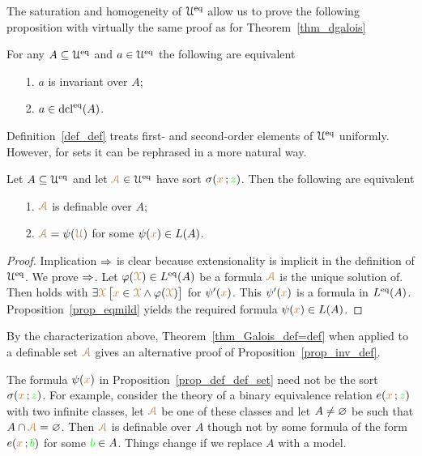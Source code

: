 \documentclass[creche.tex]{subfiles}
\begin{document}
The saturation and homogeneity of $\EuScript U^{{\rm eq}}$ allow us to prove the following proposition with virtually the same proof as for Theorem~\ref{thm_dgalois}

\begin{theorem}\label{thm_Galois_def=def}
For any $A\subseteq\EuScript U^{{\rm eq}}$ and $a\in\EuScript U^{{\rm eq}}$ the following are equivalent
\begin{itemize}
\item[1.] $a$ is invariant over $A$;
\item[2.] $a\in\mathop{\rm dcl}^{{\rm eq}}(A)$.\QED
\end{itemize}
\end{theorem}

Definition~\ref{def_def} treats first- and second-order elements of $\EuScript U^{{\rm eq}}$ uniformly.
However, for sets it can be rephrased in a more natural way.

\begin{proposition}\label{prop_def_def_set}
Let $A\subseteq\EuScript U^{{\rm eq}}$ and let ${\color{brown}\EuScript A}\in\EuScript U^{{\rm eq}}$ have sort $\sigma({\color{brown} x}\,;{\color{green} z})$.
Then the following are equivalent
\begin{itemize}
\item[1.] ${\color{brown}\EuScript A}$ is definable over $A$;
\item[2.] ${\color{brown}\EuScript A}=\psi({\color{brown}\EuScript U})$ for some $\psi({\color{brown} x})\in L(A)$.
\end{itemize}
\end{proposition}

\begin{proof}
Implication $\Rightarrow$ is clear because extensionality is implicit in the definition of $\EuScript U^{{\rm eq}}$.
We prove $\Rightarrow$.
Let $\varphi({\color{brown}\EuScript X})\in L^{{\rm eq}}(A)$ be a formula ${\color{brown}\EuScript A}$ is the unique solution of.
Then  holds with $\exists {\color{brown}\EuScript X}\,\big[{\color{brown} x}\in {\color{brown}\EuScript X}\wedge\varphi({\color{brown}\EuScript X})\big]$ for $\psi'({\color{brown} x})$. This $\psi'({\color{brown} x})$ is a formula in $L^{{\rm eq}}(A)$. Proposition~\ref{prop_eqmild} yields the required formula $\psi({\color{brown} x})\in L(A)$.
\end{proof}

By the characterization above, Theorem~\ref{thm_Galois_def=def} when applied to a definable set ${\color{brown}\EuScript A}$ gives an alternative proof of Proposition~\ref{prop_inv_def}.

The formula $\psi({\color{brown} x})$ in Proposition~\ref{prop_def_def_set} need not be the sort $\sigma({\color{brown} x}\,;{\color{green} z})$.
For example, consider the theory of a binary equivalence relation $e({\color{brown} x}\,;{\color{green} z})$ with two infinite classes, let ${\color{brown}\EuScript A}$ be one of these classes and let $A\neq\varnothing$ be such that $A\cap {\color{brown}\EuScript A}=\varnothing$.
Then ${\color{brown}\EuScript A}$ is definable over $A$ though not by some formula of the form $e({\color{brown} x}\,;{\color{green} b})$ for some ${\color{green} b}\in A$.
Things change if we replace $A$ with a model.
\end{document}
